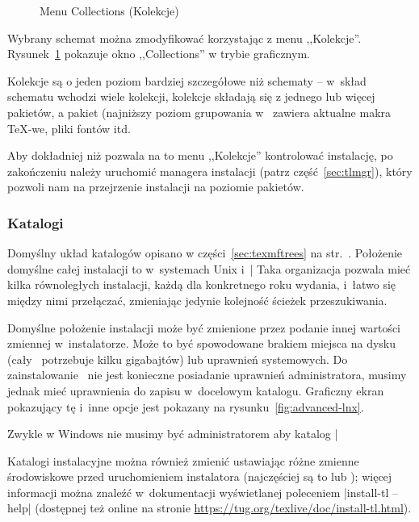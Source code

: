 \documentclass{article}
\begin{document}
\begin{figure}[tb]
\begin{center}
\def\figdesc{Menu Collections (Kolekcje)}
\centering \tlpng{stdcoll}{.7\linewidth}{\figdesc}
\caption{Menu Collections (Kolekcje)}\label{fig:collections-gui}
\end{center}
\end{figure}

Wybrany schemat można zmodyfikować korzystając z menu ,,Kolekcje''.
Rysunek~\ref{fig:collections-gui}  pokazuje okno ,,Collections'' w trybie graficznym.

Kolekcje są o jeden poziom bardziej szczegółowe niż schematy -- w~skład schematu wchodzi
wiele kolekcji, kolekcje składają się z jednego lub więcej  pakietów, a pakiet
(najniższy poziom grupowania w~\TL{} zawiera aktualne makra \TeX-we, pliki fontów itd.

Aby  dokładniej niż pozwala na to menu ,,Kolekcje'' kontrolować  instalację,
po zakończeniu należy uruchomić managera instalacji 
(patrz część~\ref{sec:tlmgr}), który pozwoli nam na przejrzenie instalacji
na poziomie pakietów.

\subsubsection{Katalogi}
\label{sec:directories}

Domyślny układ katalogów opisano w części~\ref{sec:texmftrees} na
str.~\pageref{sec:texmftrees}. Położenie domyślne całej instalacji to
 w~systemach Unix i~|%
Taka organizacja pozwala mieć  kilka równoległych instalacji, każdą dla konkretnego
roku wydania, i~łatwo się  między nimi przełączać, zmieniając jedynie
kolejność ścieżek przeszukiwania.


Domyślne położenie instalacji  może być zmienione przez podanie innej wartości
zmiennej   w~instalatorze. Może to być spowodowane  brakiem
miejsca na dysku (cały \TL\ potrzebuje kilku gigabajtów) lub uprawnień systemowych.
Do zainstalowanie \TL\ nie jest konieczne posiadanie uprawnień administratora,
musimy jednak mieć uprawnienia do zapisu w~docelowym katalogu.
Graficzny ekran pokazujący tę i~inne opcje jest pokazany na rysunku~\ref{fig:advanced-lnx}.

Zwykle w   Windows  nie musimy być administratorem aby katalog |%

Katalogi instalacyjne można również zmienić ustawiając różne
zmienne środowiskowe przed uruchomieniem instalatora (najczęściej są to
 lub
); więcej informacji można znaleźć w~dokumentacji
wyświetlanej poleceniem |install-tl --help| (dostępnej też online na stronie
\url{https://tug.org/texlive/doc/install-tl.html}).
\end{document}
